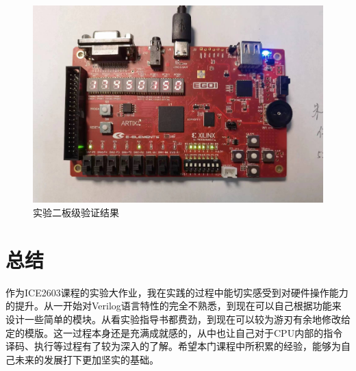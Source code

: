 \documentclass[a4paper,12pt]{article}
\begin{document}
    \begin{figure}[htbp]
        \centering
        \includegraphics[scale=0.15]{fig6.jpg}
        \caption{实验二板级验证结果}
        \label{fig:lab2_board}
    \end{figure}

    \section{总结}

    作为ICE2603课程的实验大作业，我在实践的过程中能切实感受到对硬件操作能力的提升。从一开始对Verilog语言特性的完全不熟悉，到现在可以自己根据功能来设计一些简单的模块。从看实验指导书都费劲，到现在可以较为游刃有余地修改给定的模版。这一过程本身还是充满成就感的，从中也让自己对于CPU内部的指令译码、执行等过程有了较为深入的了解。希望本门课程中所积累的经验，能够为自己未来的发展打下更加坚实的基础。
\end{document}
